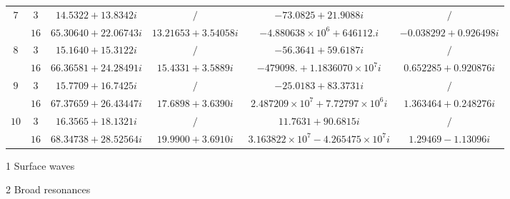 \documentclass[aps,prd,longbibliography,reprint,twocolumn,amsmath,amssymb,amsfonts,showpacs,superscriptaddress]{revtex4-1}%
\begin{document}
\begin{table}[htp]
\begin{threeparttable}[htp]
\begin{ruledtabular}
\begin{tabular}{cccccc}
$7$  & $3$  & $14.5322+13.8342 i$  & $/$   & $-73.0825+21.9088 i$ & $/$     \\
     & $16$  & $65.30640+22.06743 i$  & $13.21653+3.54058 i$  & $-4.880638\times 10^6+646112. i$  & $-0.038292+0.926498 i$    \\

$8$  & $3$  & $15.1640+15.3122 i$  & $/$   & $-56.3641+59.6187 i$ & $/$     \\
     & $16$  & $66.36581+24.28491 i$  & $15.4331+3.5889 i$  & $-479098.+1.1836070\times 10^7 i$  & $0.652285+0.920876 i$    \\

$9$  & $3$  & $15.7709+16.7425 i$  & $/$   & $-25.0183+83.3731 i$ & $/$     \\
     & $16$  & $67.37659+26.43447 i$  & $17.6898+3.6390 i$  & $2.487209\times 10^7+7.72797\times 10^6 i$  & $1.363464+0.248276 i$    \\

$10$  & $3$  & $16.3565+18.1321 i$  & $/$   & $11.7631+90.6815 i$ & $/$     \\
     & $16$  & $68.34738+28.52564 i $  & $19.9900+3.6910 i$  & $3.163822\times 10^7-4.265475\times 10^7 i$  & $1.29469-1.13096 i$    \\
\end{tabular}
\end{ruledtabular}
\begin{tablenotes}
     \item[1] Surface waves
     \item[2] Broad resonances
   \end{tablenotes}
\end{threeparttable}
\end{table}
\endgroup
\end{document}
